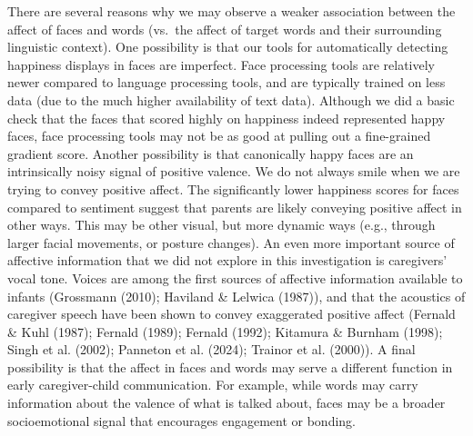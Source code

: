 \documentclass[10pt, letterpaper]{article}
\begin{document}
There are several reasons why we may observe a weaker association
between the affect of faces and words (vs.~the affect of target words
and their surrounding linguistic context). One possibility is that our
tools for automatically detecting happiness displays in faces are
imperfect. Face processing tools are relatively newer compared to
language processing tools, and are typically trained on less data (due
to the much higher availability of text data). Although we did a basic
check that the faces that scored highly on happiness indeed represented
happy faces, face processing tools may not be as good at pulling out a
fine-grained gradient score. Another possibility is that canonically
happy faces are an intrinsically noisy signal of positive valence. We do
not always smile when we are trying to convey positive affect. The
significantly lower happiness scores for faces compared to sentiment
suggest that parents are likely conveying positive affect in other ways.
This may be other visual, but more dynamic ways (e.g., through larger
facial movements, or posture changes). An even more important source of
affective information that we did not explore in this investigation is
caregivers' vocal tone. Voices are among the first sources of affective
information available to infants (Grossmann (2010); Haviland \& Lelwica
(1987)), and that the acoustics of caregiver speech have been shown to
convey exaggerated positive affect (Fernald \& Kuhl (1987); Fernald
(1989); Fernald (1992); Kitamura \& Burnham (1998); Singh et al. (2002);
Panneton et al. (2024); Trainor et al. (2000)). A final possibility is
that the affect in faces and words may serve a different function in
early caregiver-child communication. For example, while words may carry
information about the valence of what is talked about, faces may be a
broader socioemotional signal that encourages engagement or bonding.
\end{document}
